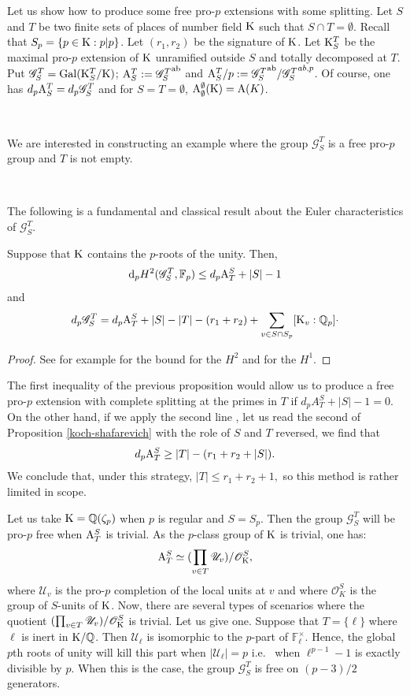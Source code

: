 \documentclass[12pt,a4paper,twoside,english]{smfart}
\def\K{{\rm K}}
\def\Q{{\mathbb Q}}
\def\fq{{\mathbb F}}
\def\d{{\rm d}}
\def\G{{\mathcal G}}
\def\O{{\mathcal O}}
\def\U{{\mathcal U}}
\def\p{{\mathfrak p}}
\def\Gal{{\rm Gal}}
\def\ab{{\mathrm{ab}}}
\def\GST{{\G_S^T}}
\def\A{{\rm A}}
\begin{document}
\medskip

Let us show how to produce some free pro-$p$ extensions with some splitting.
Let $S$ and $T$ be two finite sets of places of number field $\K$ such that $S\cap T =\emptyset$. 
Recall that  $S_p=\{\p \in \K: \p|p\}$. Let $(r_1,r_2)$ be the signature of $\K$.
Let $\K_S^T$ be the maximal pro-$p$ extension of  $\K$ unramified outside $S$ and totally decomposed at $T$.
Put $\GST = \Gal(\K_S^T/\K)$;  $\A_S^T:=\GST^{\ab}$ and $\A_S^T/p:= \GST^{\ab}/\GST^{ab,p}$. Of course, one has $d_p \A_S^T = d_p \G_S^T$ and for $S=T=\emptyset$, $\A_\emptyset^\emptyset(\K)=\A(K)$.

\

We are interested in constructing an example where the group $\GST$ is a free pro-$p$ group and  $T$ is not empty. 

\

The following is a fundamental and classical result about the Euler characteristics of $\GST$.

\begin{prop} \label{koch-shafarevich} Suppose that $\K$ contains the $p$-roots of the unity.
Then, $$\d_p H^2(\GST,\fq_p) \leq d_p \A_T^S + |S| - 1$$
and $$d_p \GST = d_p \A_T^S+ |S| - |T| -(r_1+r_2) + \sum_{v\in S \cap S_p}[\K_v:\Q_p]\cdot$$
\end{prop}

\begin{proof}
See   for example \cite[Corollary 3.7.2, Appendix]{gras}  for the bound for the $H^2$ and \cite[Theorem 4.6, Chapter I, \S 4]{gras} for the $H^1$.
\end{proof} 

The first  inequality of the previous proposition  would allow us   to produce a free pro-$p$ extension with complete splitting at the primes in $T$ if $d_p A_T^S +|S| - 1=0$.  
On the other hand, if we apply the second line , let us read the second of Proposition \ref{koch-shafarevich} with the role of $S$ and $T$ reversed, we find that $$d_p \A_T^S \geq |T|-(r_1+r_2+|S|).$$ We conclude that, under this strategy, $|T| \leq r_1 + r_2 + 1,$ so this method is rather limited in scope.   

\medskip

Let us take $\K=\Q(\zeta_p)$ when $p$ is regular and $S=S_p$. Then the group $\GST$ will be pro-$p$ free when $\A_T^S$ is trivial. 
As the $p$-class group of $\K$ is trivial, one has:
$$\A_T^S \simeq (\prod_{v\in T} \U_v)/\O_\K^S,$$
where $\U_v$ is the pro-$p$ completion of the local units at $v$ and where $\O_K^S$ is the group of $S$-units of $\K$.
Now, there are several types of scenarios where the quotient $(\prod_{v\in T} \U_v)/\O_\K^S$ is trivial. Let us give one. Suppose that $T=\{\ell\}$ where $\ell$ is inert in $\K/\Q$. Then $\U_\ell $ is isomorphic to the $p$-part of $\fq_\ell^\times$. Hence, the global $p$th roots of unity will kill this part when $|\U_\ell|=p$ i.e.~ when  $\ell^{p-1}-1$ is exactly divisible by $p$. When this is the case, the group $\GST$ is free  on $(p-3)/2$ generators.
\end{document}
